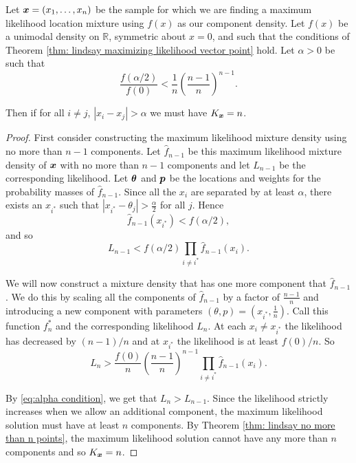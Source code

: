 		\begin{theorem}
			Let ${\bm{{x}}} = (x_1, \dots, x_n)$ be the sample for which we are finding a maximum likelihood location mixture using $f(x)$ as our component density. Let $f(x)$ be a unimodal density on $\mathbb{R}$, symmetric about $x = 0$, and such that the conditions of Theorem \ref{thm: lindsay maximizing likelihood vector point} hold. Let $\alpha > 0$ be such that
			\begin{equation}
				\frac{f(\alpha/2)}{f(0)} < \frac{1}{n}\left(\frac{n-1}{n}\right)^{n-1}.
				\label{eq:alpha condition}
			\end{equation}
			

			Then if for all $i\neq j$, $|x_i - x_j| > \alpha$ we must have $K_{\bm{{x}}} = n$.
		\end{theorem}
		\begin{proof}
			First consider constructing the maximum likelihood mixture density using no more than $n-1$ components. Let $\hat{f}_{n-1}$ be this maximum likelihood mixture density of ${\bm{{x}}}$ with no more than $n-1$ components and let $L_{n-1}$ be the corresponding likelihood. Let ${\bm{{\theta}}}$ and ${\bm{{p}}}$ be the locations and weights for the probability masses of $\hat{f}_{n-1}$. Since all the $x_i$ are separated by at least $\alpha$, there exists an $x_{i^*}$ such that $|x_{i^*} - \theta_j|>\frac{\alpha}{2}$ for all $j$. Hence
			\begin{equation}
				\hat{f}_{n-1}(x_{i^*}) < f(\alpha/2),
			\end{equation}
			and so
			\begin{equation}
				L_{n-1} < f(\alpha/2) \prod_{i\neq i^*} \hat{f}_{n-1}(x_{i}).	
			\end{equation}
						
			We will now construct a mixture density that has one more component that $\hat{f}_{n-1}$. We do this by scaling all the components of $\hat{f}_{n-1}$ by a factor of $\frac{n-1}{n}$ and introducing a new component with parameters $(\theta, p) = (x_{i^*},\frac{1}{n})$. Call this function $f^*_n$ and the corresponding likelihood $L_n$. At each $x_i \neq x_{i^*}$ the likelihood has decreased by $(n-1)/n$ and at $x_{i^*}$ the likelihood is at least $f(0)/n$. So
			\begin{equation}
				L_n > \frac{f(0)}{n} \left(\frac{n-1}{n}\right)^{n-1}\prod_{i\neq i^*} \hat{f}_{n-1}(x_i).	
			\end{equation}
			
			By \eqref{eq:alpha condition}, we get that $L_n > L_{n-1}$. Since the likelihood strictly increases when we allow an additional component, the maximum likelihood solution must have at least $n$ components. By Theorem \ref{thm: lindsay no more than n points}, the maximum likelihood solution cannot have any more than $n$ components and so $K_{\bm{{x}}} = n$.
		\end{proof}

